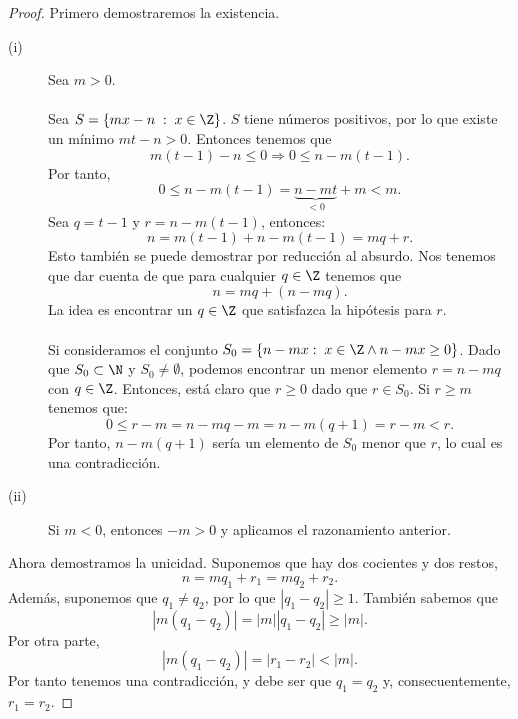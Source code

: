\begin{proof}
Primero demostraremos la existencia. \\
\begin{description}
\item[(i)] Sea $\displaystyle m>0 $. \\ \\
	Sea $\displaystyle S = \left\{ mx-n\; : \; x \in \Z\right\}  $. $\displaystyle S $ tiene números positivos, por lo que existe un mínimo $\displaystyle mt-n>0 $. Entonces tenemos que
	\[m\left(t-1\right)-n \leq0 \Rightarrow 0 \leq n - m\left(t-1\right) .\]
	Por tanto, 
	\[0 \leq n - m\left(t-1\right) = \underbrace{n - mt}_{<0} + m < m .\]
Sea $\displaystyle  q = t - 1 $ y $\displaystyle  r = n - m\left(t- 1\right) $, entonces:
\[n = m\left(t-1\right)+n-m\left(t-1\right)=mq +r .\]
Esto también se puede demostrar por reducción al absurdo. Nos tenemos que dar cuenta de que para cualquier $\displaystyle q \in \Z $ tenemos que 
\[n = mq + \left(n - mq\right) .\]
La idea es encontrar un $\displaystyle q \in \Z $ que satisfazca la hipótesis para $\displaystyle r $. \\ \\
Si consideramos el conjunto $\displaystyle S_{0}=\{n-mx: \; x \in \Z \land n-mx \geq 0\} $. Dado que $\displaystyle S_{0} \subset \N $ y $\displaystyle S_{0} \neq \emptyset $, podemos encontrar un menor elemento $\displaystyle r = n - mq $ con $\displaystyle q \in \Z $. Entonces, está claro que $\displaystyle  r \geq 0 $ dado que $\displaystyle r \in S_{0} $. Si $\displaystyle r \geq m $ tenemos que:
\[0\leq r - m = n - mq - m = n - m \left(q + 1\right) = r - m < r .\]
Por tanto, $\displaystyle n - m\left(q+1\right) $ sería un elemento de $\displaystyle S_{0} $ menor que $\displaystyle r $, lo cual es una contradicción. 
\item[(ii)] Si $\displaystyle m < 0 $, entonces $\displaystyle  -m >0 $ y aplicamos el razonamiento anterior. 
\end{description}
Ahora demostramos la unicidad. Suponemos que hay dos cocientes y dos restos, 
\[n = mq_{1}+r_{1}= mq_{2}+r_{2} .\]
Además, suponemos que $\displaystyle q_{1}\neq q_{2} $, por lo que $\displaystyle \left|q_{1}-q_{2}\right|\geq 1 $. También sabemos que 
\[|m\left(q_{1}-q_{2}\right)| = \left|m\right| \left|q_{1}-q_{2}\right| \geq \left|m\right| .\]
Por otra parte, 
\[|m\left(q_{1}-q_{2}\right)|=|r_{1}-r_{2}| < \left|m\right| .\]
Por tanto tenemos una contradicción, y debe ser que $\displaystyle q_{1}=q_{2} $ y, consecuentemente, $\displaystyle r_{1}=r_{2} $.
\end{proof}

